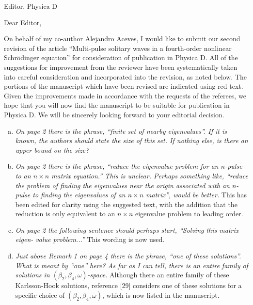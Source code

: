 \documentclass[11pt]{letter}
\begin{document}
\address{Ross Parker \\
Department of Mathematics \\
Southern Methodist University \\
Dallas, TX 75275 \\
\texttt{rhparker@smu.edu}}%
\signature{Ross Parker}
\begin{letter}{Editor, Physica D}

\opening{Dear Editor,}

On behalf of my co-author Alejandro Aceves, I would like to submit our second revision of the article ``Multi-pulse solitary waves in a fourth-order nonlinear {S}chr{\"o}dinger equation'' for consideration of publication in Physica D. All of the suggestions for improvement from the reviewer have been systematically taken into careful consideration and incorporated into the revision, as noted below. The portions of the manuscript which have been revised are indicated using red text. Given the improvements made in accordance with the requests of the referees, we hope that you will now find the manuscript to be suitable for publication in Physica D. We will be sincerely looking forward to your editorial decision.

\begin{enumerate}[(a)]
\item \emph{On page 2 there is the phrase, ``finite set of nearby eigenvalues''. If it is known, the authors should state the size of this set. If nothing else, is there an upper bound on the size?}

\item \emph{On page 2 there is the phrase, ``reduce the eigenvalue problem for an $n$-pulse to an $n\times n$ matrix equation.'' This is unclear. Perhaps something like, ``reduce the problem of finding the eigenvalues near the origin associated with an $n$-pulse to finding the eigenvalues of an $n\times n$ matrix'', would be better.} This has been edited for clarity using the suggested text, with the addition that the reduction is only equivalent to an $n\times n$ eigenvalue problem to leading order.

\item \emph{On page 2 the following sentence should perhaps start, ``Solving this matrix eigen- value problem...''} This wording is now used.

\item \emph{Just above Remark 1 on page 4 there is the phrase, ``one of these solutions''. What is meant by ``one'' here? As far as I can tell, there is an entire family of solutions in $(\beta_2, \beta_4, \omega)$-space.} Although there an entire family of these Karlsson-Hook solutions, reference [29] considers one of these solutions for a specific choice of $(\beta_2, \beta_4, \omega)$, which is now listed in the manuscript.


\end{enumerate}
\end{letter}
\end{document}
